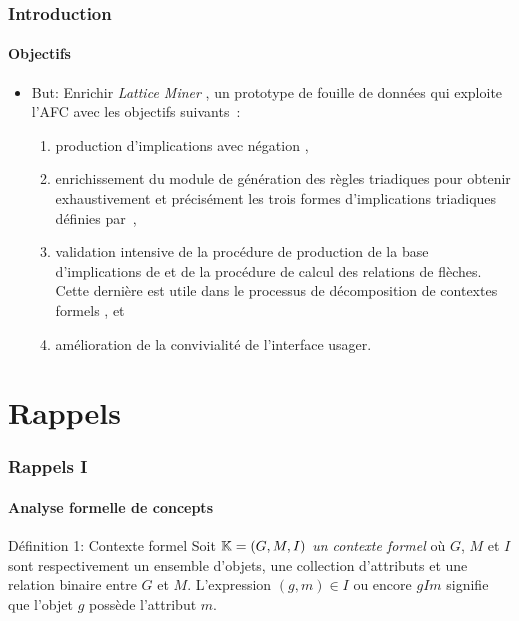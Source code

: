 \documentclass[french]{beamer}
\def\KK{\mathbb{K}}
\begin{document}
\begin{frame}
\frametitle{Introduction}
\framesubtitle{Objectifs}
\begin{itemize}
\item But: Enrichir \emph{Lattice Miner} \parencite{Roberge2007}, un prototype de fouille de données qui exploite l’AFC avec les objectifs suivants~:

\begin{enumerate}
\item production d’implications avec négation \parencite{Missaoui2012},
\item enrichissement du module de génération des règles triadiques pour obtenir exhaustivement et précisément les trois formes d’implications triadiques définies par~\parencite{Ganter2004},
\item validation intensive de la procédure de production de la base d’implications de \parencite{Guigues1986} et de la procédure de calcul des relations de flèches. Cette dernière est utile dans le processus de décomposition de contextes formels \parencite{Viaud2015}, et
\item amélioration de la convivialité de l'interface usager.
\end{enumerate}
\end{itemize}
\end{frame}

\section{Rappels}

\begin{frame}
\frametitle{Rappels I}
\framesubtitle{Analyse formelle de concepts}
\begin{block}{Définition 1: Contexte formel}
Soit $\KK = \GMI$ \emph{un contexte formel} où $G$, $M$ et $I$ sont respectivement un ensemble d'objets, une collection d'attributs et une relation binaire entre $G$ et $M$. L'expression $(g,m) \in I$ ou encore $gIm$ signifie que l'objet $g$ possède l'attribut $m$.
\end{block}

\begin{table}[H]
\begin{center}
\begin{cxt}%
\cxtName{}%
%
%
%
%
%
%
\end{cxt}
\end{center}
\caption{Exemple de contexte \context}
\label{cap:context-simple}
\end{table}
\end{frame}
\end{document}
